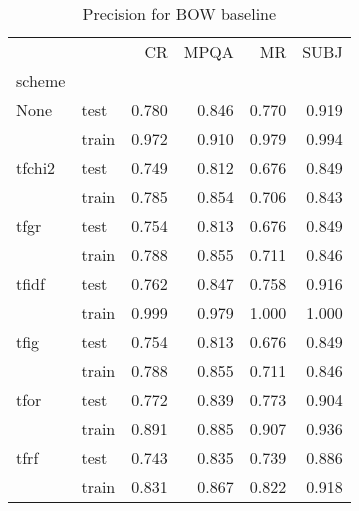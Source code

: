 \begin{table}[h]
\begin{center}

\begin{tabular}{llrrrr}
\toprule
{} &      &  CR &  MPQA &  MR &  SUBJ \\
scheme &  &            &              &            &              \\
\midrule
None & test &      0.780 &        0.846 &      0.770 &        0.919 \\
{} & train &      0.972 &        0.910 &      0.979 &        0.994 \\
tfchi2 & test &      0.749 &        0.812 &      0.676 &        0.849 \\
{} & train &      0.785 &        0.854 &      0.706 &        0.843 \\
tfgr & test &      0.754 &        0.813 &      0.676 &        0.849 \\
{} & train &      0.788 &        0.855 &      0.711 &        0.846 \\
tfidf & test &      0.762 &        0.847 &      0.758 &        0.916 \\
{} & train &      0.999 &        0.979 &      1.000 &        1.000 \\
tfig & test &      0.754 &        0.813 &      0.676 &        0.849 \\
{} & train &      0.788 &        0.855 &      0.711 &        0.846 \\
tfor & test &      0.772 &        0.839 &      0.773 &        0.904 \\
{} & train &      0.891 &        0.885 &      0.907 &        0.936 \\
tfrf & test &      0.743 &        0.835 &      0.739 &        0.886 \\
{} & train &      0.831 &        0.867 &      0.822 &        0.918 \\
\bottomrule
\end{tabular}

\caption[Precision for BOW baseline]{Precision for BOW baseline}
\label{tab:}
\end{center}
\end{table}


